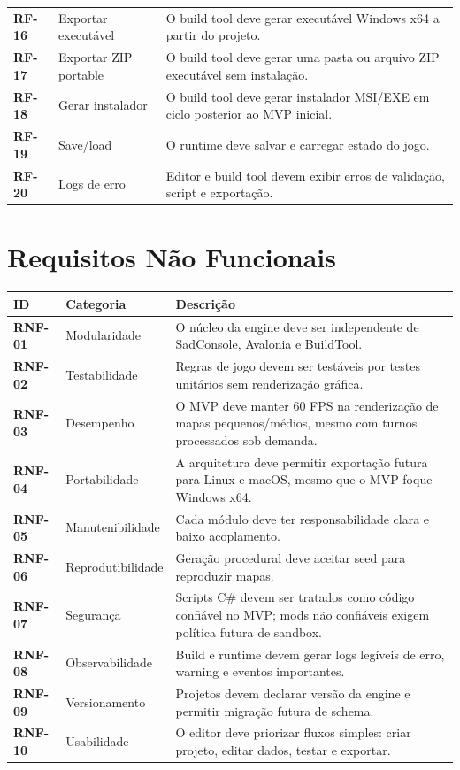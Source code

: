 \documentclass[12pt,a4paper]{article}
\newcommand{\req}[1]{\textbf{#1}}
\begin{document}
\begin{longtable}{p{2.1cm}p{4.1cm}p{7.8cm}}
\req{RF-16} & Exportar executável & O build tool deve gerar executável Windows x64 a partir do projeto. \\
\req{RF-17} & Exportar ZIP portable & O build tool deve gerar uma pasta ou arquivo ZIP executável sem instalação. \\
\req{RF-18} & Gerar instalador & O build tool deve gerar instalador MSI/EXE em ciclo posterior ao MVP inicial. \\
\req{RF-19} & Save/load & O runtime deve salvar e carregar estado do jogo. \\
\req{RF-20} & Logs de erro & Editor e build tool devem exibir erros de validação, script e exportação. \\
\bottomrule
\end{longtable}

\section{Requisitos Não Funcionais}

\begin{longtable}{p{2.1cm}p{4.1cm}p{7.8cm}}
\toprule
\textbf{ID} & \textbf{Categoria} & \textbf{Descrição} \\
\midrule
\req{RNF-01} & Modularidade & O núcleo da engine deve ser independente de SadConsole, Avalonia e BuildTool. \\
\req{RNF-02} & Testabilidade & Regras de jogo devem ser testáveis por testes unitários sem renderização gráfica. \\
\req{RNF-03} & Desempenho & O MVP deve manter 60 FPS na renderização de mapas pequenos/médios, mesmo com turnos processados sob demanda. \\
\req{RNF-04} & Portabilidade & A arquitetura deve permitir exportação futura para Linux e macOS, mesmo que o MVP foque Windows x64. \\
\req{RNF-05} & Manutenibilidade & Cada módulo deve ter responsabilidade clara e baixo acoplamento. \\
\req{RNF-06} & Reprodutibilidade & Geração procedural deve aceitar seed para reproduzir mapas. \\
\req{RNF-07} & Segurança & Scripts C\# devem ser tratados como código confiável no MVP; mods não confiáveis exigem política futura de sandbox. \\
\req{RNF-08} & Observabilidade & Build e runtime devem gerar logs legíveis de erro, warning e eventos importantes. \\
\req{RNF-09} & Versionamento & Projetos devem declarar versão da engine e permitir migração futura de schema. \\
\req{RNF-10} & Usabilidade & O editor deve priorizar fluxos simples: criar projeto, editar dados, testar e exportar. \\
\bottomrule
\end{longtable}
\end{document}

